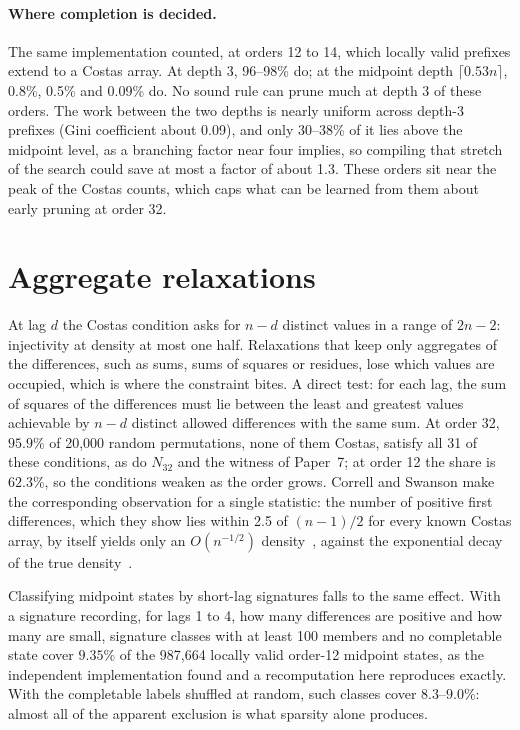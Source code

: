 \paragraph{Where completion is decided.} The same implementation counted, at orders 12 to 14, which locally
valid prefixes extend to a Costas array. At depth 3, 96--98\% do; at the midpoint depth $\lceil0.53n\rceil$,
0.8\%, 0.5\% and 0.09\% do. No sound rule can prune much at depth 3 of these orders. The work between the two
depths is nearly uniform across depth-3 prefixes (Gini coefficient about 0.09), and only 30--38\% of it lies
above the midpoint level, as a branching factor near four implies, so compiling that stretch of the search
could save at most a factor of about 1.3. These orders sit near the peak of the Costas counts, which caps
what can be learned from them about early pruning at order 32.

\section{Aggregate relaxations}
\label{sec:aggregate}
At lag $d$ the Costas condition asks for $n-d$ distinct values in a range of $2n-2$: injectivity at density
at most one half. Relaxations that keep only aggregates of the differences, such as sums, sums of squares
or residues, lose which values are occupied, which is where the constraint bites. A direct test: for each
lag, the sum of squares of the differences must lie between the least and greatest values achievable by
$n-d$ distinct allowed differences with the same sum. At order 32, $95.9\%$ of 20{,}000 random permutations,
none of them Costas, satisfy all 31 of these conditions, as do $N_{32}$ and the witness of Paper~7; at
order 12 the share is $62.3\%$, so the conditions weaken as the order grows. Correll and Swanson make the
corresponding observation for a single statistic: the number of positive first differences, which they
show lies within 2.5 of $(n-1)/2$ for every known Costas array, by itself yields only an $O(n^{-1/2})$
density~\cite{correll2023difference}, against the exponential decay of the true
density~\cite{warnke2023density}.

Classifying midpoint states by short-lag signatures falls to the same effect. With a signature recording,
for lags 1 to 4, how many differences are positive and how many are small, signature classes with at least
100 members and no completable state cover $9.35\%$ of the 987{,}664 locally valid order-12 midpoint states,
as the independent implementation found and a recomputation here reproduces exactly. With the completable
labels shuffled at random, such classes cover $8.3$--$9.0\%$: almost all of the apparent exclusion is what
sparsity alone produces.

